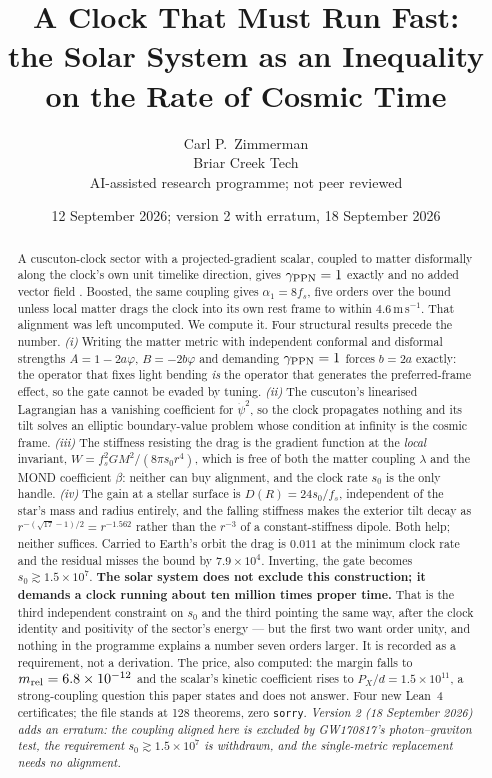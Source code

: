 \documentclass[11pt,letterpaper]{article}
\title{A Clock That Must Run Fast:\\ the Solar System as an Inequality\\ on the Rate of Cosmic Time}
\author{Carl P.\ Zimmerman\\ \small Briar Creek Tech\\ \small AI-assisted research programme; not peer reviewed}
\date{12 September 2026; version 2 with erratum, 18 September 2026}
\begin{document}
\maketitle
\begin{abstract}
A cuscuton-clock sector with a projected-gradient scalar, coupled to matter disformally along the clock's own unit timelike direction, gives $\gamma_{\rm PPN}=1$ exactly and no added vector field \cite{paper24}. Boosted, the same coupling gives $\alpha_1=8f_s$, five orders over the bound unless local matter drags the clock into its own rest frame to within $4.6\,$m$\,$s$^{-1}$. That alignment was left uncomputed. We compute it. Four structural results precede the number. \emph{(i)} Writing the matter metric with independent conformal and disformal strengths $A=1-2a\varphi$, $B=-2b\varphi$ and demanding $\gamma_{\rm PPN}=1$ forces $b=2a$ exactly: the operator that fixes light bending \emph{is} the operator that generates the preferred-frame effect, so the gate cannot be evaded by tuning. \emph{(ii)} The cuscuton's linearised Lagrangian has a vanishing coefficient for $\dot\psi^2$, so the clock propagates nothing and its tilt solves an elliptic boundary-value problem whose condition at infinity is the cosmic frame. \emph{(iii)} The stiffness resisting the drag is the gradient function at the \emph{local} invariant, $W=f_s^2GM^2/(8\pi s_0r^4)$, which is free of both the matter coupling $\lambda$ and the MOND coefficient $\beta$: neither can buy alignment, and the clock rate $s_0$ is the only handle. \emph{(iv)} The gain at a stellar surface is $D(R)=24s_0/f_s$, independent of the star's mass and radius entirely, and the falling stiffness makes the exterior tilt decay as $r^{-(\sqrt{17}-1)/2}=r^{-1.562}$ rather than the $r^{-3}$ of a constant-stiffness dipole. Both help; neither suffices. Carried to Earth's orbit the drag is $0.011$ at the minimum clock rate and the residual misses the bound by $7.9\times10^4$. Inverting, the gate becomes $s_0\gtrsim1.5\times10^7$. \textbf{The solar system does not exclude this construction; it demands a clock running about ten million times proper time.} That is the third independent constraint on $s_0$ and the third pointing the same way, after the clock identity and positivity of the sector's energy --- but the first two want order unity, and nothing in the programme explains a number seven orders larger. It is recorded as a requirement, not a derivation. The price, also computed: the margin falls to $m_{\rm rel}=6.8\times10^{-12}$ and the scalar's kinetic coefficient rises to $P_X/d=1.5\times10^{11}$, a strong-coupling question this paper states and does not answer. Four new Lean~4 certificates; the file stands at 128 theorems, zero \texttt{sorry}.
 \emph{Version 2 (18 September 2026) adds an erratum: the coupling aligned here is excluded by GW170817's photon--graviton test, the requirement $s_0\gtrsim1.5\times10^{7}$ is withdrawn, and the single-metric replacement needs no alignment.}
\end{abstract}
\end{document}
